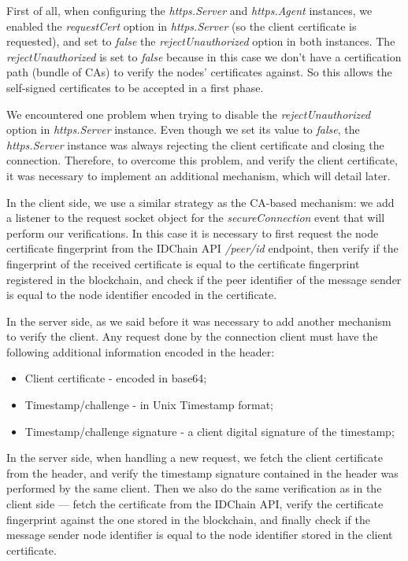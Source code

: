 First of all, when configuring the \textit{https.Server} and \textit{https.Agent} instances, we enabled the \textit{requestCert} option in \textit{https.Server} (so the client certificate is requested), and set to \textit{false} the \textit{rejectUnauthorized} option in both instances.
The \textit{rejectUnauthorized} is set to \textit{false} because in this case we don't have a certification path (bundle of CAs) to verify the nodes' certificates against.
So this allows the self-signed certificates to be accepted in a first phase.

We encountered one problem when trying to disable the \textit{rejectUnauthorized} option in \textit{https.Server} instance.
Even though we set its value to \textit{false}, the \textit{https.Server} instance was always rejecting the client certificate and closing the connection.
Therefore, to overcome this problem, and verify the client certificate, it was necessary to implement an additional mechanism, which will detail later.

In the client side, we use a similar strategy as the CA-based mechanism: we add a listener to the request socket object for the \textit{secureConnection} event that will perform our verifications.
In this case it is necessary to first request the node certificate fingerprint from the IDChain API \textit{/peer/id} endpoint, then verify if the fingerprint of the received certificate is equal to the certificate fingerprint registered in the blockchain, and check if the peer identifier of the message sender is equal to the node identifier encoded in the certificate.

In the server side, as we said before it was necessary to add another mechanism to verify the client.
Any request done by the connection client must have the following additional information encoded in the header:

\begin{itemize}
  \item Client certificate - encoded in base64;
  \item Timestamp/challenge - in Unix Timestamp format;
  \item Timestamp/challenge signature - a client digital signature of the timestamp;
\end{itemize}

In the server side, when handling a new request, we fetch the client certificate from the header, and verify the timestamp signature contained in the header was performed by the same client.
Then we also do the same verification as in the client side — fetch the certificate from the IDChain API, verify the certificate fingerprint against the one stored in the blockchain, and finally check if the message sender node identifier is equal to the node identifier stored in the client certificate.

